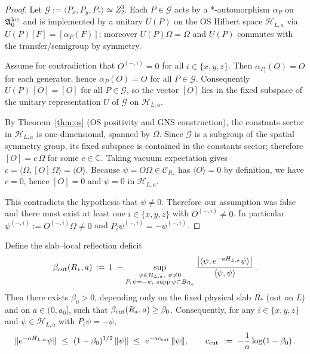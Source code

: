 \documentclass[11pt]{amsart}
\begin{document}
\begin{proof}
Let $\mathcal{G}:=\langle P_x,P_y,P_z\rangle\simeq Z_2^3$. Each $P\in\mathcal{G}$ acts by a *-automorphism $\alpha_P$ on $\mathfrak{A}_0^{\rm loc}$ and is implemented by a unitary $U(P)$ on the OS Hilbert space $\mathcal{H}_{L,a}$ via $U(P)[F]=[\alpha_P(F)]$; moreover $U(P)\Omega=\Omega$ and $U(P)$ commutes with the transfer/semigroup by symmetry.

Assume for contradiction that $O^{(-,i)}=0$ for all $i\in\{x,y,z\}$. Then $\alpha_{P_i}(O)=O$ for each generator, hence $\alpha_P(O)=O$ for all $P\in\mathcal{G}$. Consequently $U(P)\,[O]=[O]$ for all $P\in\mathcal{G}$, so the vector $[O]$ lies in the fixed subspace of the unitary representation $U$ of $\mathcal{G}$ on $\mathcal{H}_{L,a}$.

By Theorem~\ref{thm:os} (OS positivity and GNS construction), the constants sector in $\mathcal{H}_{L,a}$ is one-dimensional, spanned by $\Omega$. Since $\mathcal{G}$ is a subgroup of the spatial symmetry group, its fixed subspace is contained in the constants sector; therefore $[O]=c\,\Omega$ for some $c\in\mathbb{C}$. Taking vacuum expectation gives $c=\langle\Omega,[O]\,\Omega\rangle=\langle O\rangle$. Because $\psi=O\Omega\in\mathcal{C}_{R_*}$ has $\langle O\rangle=0$ by definition, we have $c=0$, hence $[O]=0$ and $\psi=0$ in $\mathcal{H}_{L,a}$.

This contradicts the hypothesis that $\psi\ne 0$. Therefore our assumption was false and there must exist at least one $i\in\{x,y,z\}$ with $O^{(-,i)}\ne 0$. In particular $\psi^{(-,i)}:=O^{(-,i)}\Omega\ne 0$ and $P_i\psi^{(-,i)}=-\psi^{(-,i)}$.
\end{proof}

\begin{lemma}\label{lem:odd-contraction-tp}
Define the slab--local reflection deficit
\[
  \beta_{\rm cut}(R_*,a)
  \,:=\,
  1\;-
  \sup_{\substack{\psi\in\mathcal H_{L,a},\ \psi\ne 0\\ P_i\psi=-\psi,\ \mathrm{supp}\,\psi\subset B_{R_*}}}
  \frac{\big|\langle\psi, e^{-aH_{L,a}}\psi\rangle\big|}{\langle\psi,\psi\rangle}\,.
\]
Then there exists $\beta_0>0$, depending only on the fixed physical slab $R_*$ (not on $L$) and on $a\in(0,a_0]$, such that $\beta_{\rm cut}(R_*,a)\ge \beta_0$. Consequently, for any $i\in\{x,y,z\}$ and $\psi\in\mathcal{H}_{L,a}$ with $P_i\psi=-\psi$,
\[
  \|e^{-aH_{L,a}}\psi\|\ \le\ (1-\beta_0)^{1/2}\,\|\psi\|\ \le\ e^{-a c_{\rm cut}}\,\|\psi\|,
  \qquad c_{\rm cut}\ :=\ -\frac{1}{a}\log(1-\beta_0)\,.
\]
\end{lemma}
\end{document}
